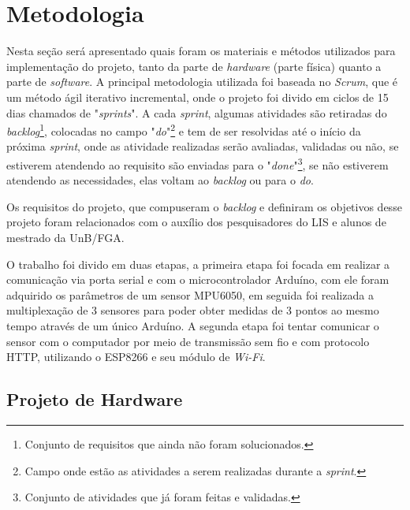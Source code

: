 \chapter[Metodologia]{Metodologia}

Nesta seção será apresentado quais foram os materiais e métodos utilizados para implementação do projeto, tanto da parte de \textit{hardware} (parte física) quanto a parte de \textit{software}. A principal metodologia utilizada foi baseada  no \textit{Scrum}, que é um método ágil iterativo incremental, onde o projeto foi divido em ciclos de 15 dias chamados de "\textit{sprints}". A cada \textit{sprint}, algumas atividades são retiradas do \textit{backlog}\footnote{Conjunto de requisitos que ainda não foram solucionados.}, colocadas no campo "\textit{do}"\footnote{Campo onde estão as atividades a serem realizadas durante a \textit{sprint}.}  e tem de ser resolvidas até o início da próxima \textit{sprint}, onde as atividade realizadas serão avaliadas,  validadas ou não, se estiverem atendendo ao requisito são enviadas para o "\textit{done}"\footnote{Conjunto de atividades que já foram feitas e validadas.}, se não estiverem atendendo as necessidades, elas voltam ao \textit{backlog} ou para o \textit{do}.

Os requisitos do projeto, que compuseram o \textit{backlog} e definiram os objetivos desse projeto foram relacionados com o auxílio dos pesquisadores do LIS e alunos de mestrado da UnB/FGA.

O trabalho foi divido em duas etapas, a primeira etapa foi focada em realizar a comunicação via porta serial  e com o microcontrolador Arduíno, com ele foram adquirido os parâmetros de um sensor MPU6050, em seguida foi realizada a multiplexação de 3 sensores para poder obter medidas de 3 pontos ao mesmo tempo através de um único Arduíno. A segunda etapa foi tentar comunicar o sensor com o computador por meio de transmissão sem fio e com protocolo HTTP, utilizando o ESP8266 e seu módulo de \textit{Wi-Fi}.
   
\section{Projeto de Hardware}

